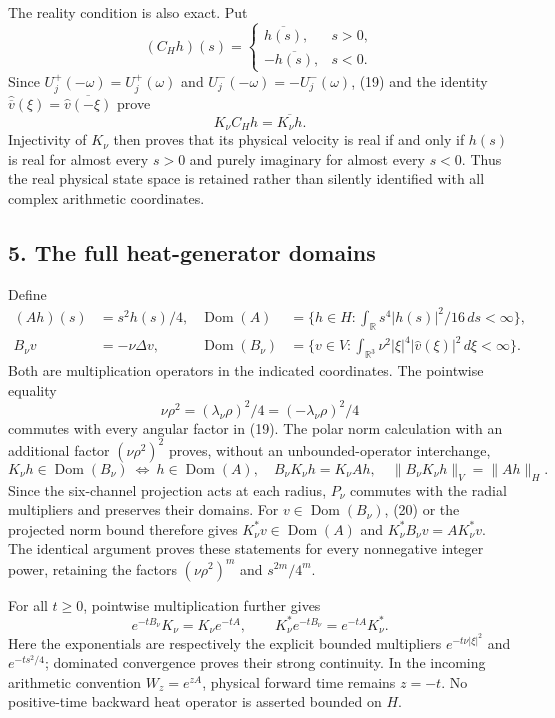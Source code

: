 The reality condition is also exact. Put \[
(C_Hh)(s)=\begin{cases}\overline{h(s)},&s>0,\\-\overline{h(s)},&s<0.\end{cases}
\tag{21}
\] Since \(U_j^+(-\omega)=U_j^+(\omega)\) and \(U_j^-(-\omega)=-U_j^-(\omega)\), (19) and the identity \(\widehat{\overline v}(\xi)=\overline{\widehat v(-\xi)}\) prove \[
K_\nu C_Hh=\overline{K_\nu h}.
\tag{22}
\] Injectivity of \(K_\nu\) then proves that its physical velocity is real if and only if \(h(s)\) is real for almost every \(s>0\) and purely imaginary for almost every \(s<0\). Thus the real physical state space is retained rather than silently identified with all complex arithmetic coordinates.

\subsection*{5. The full heat-generator domains}

Define \[
\begin{aligned}
(Ah)(s)&=s^2h(s)/4,&
\operatorname{Dom}(A)&=\{h\in H:\int_{\mathbb R}s^4|h(s)|^2/16\,ds<\infty\},\\
B_\nu v&=-\nu\Delta v,&
\operatorname{Dom}(B_\nu)&=\{v\in V:\int_{\mathbb R^3}\nu^2|\xi|^4|\widehat v(\xi)|^2\,d\xi<\infty\}.
\end{aligned}
\tag{23}
\] Both are multiplication operators in the indicated coordinates. The pointwise equality \[
\nu\rho^2=(\lambda_\nu\rho)^2/4=(-\lambda_\nu\rho)^2/4
\tag{24}
\] commutes with every angular factor in (19). The polar norm calculation with an additional factor \((\nu\rho^2)^2\) proves, without an unbounded-operator interchange, \[
K_\nu h\in\operatorname{Dom}(B_\nu)\ \Longleftrightarrow\ h\in\operatorname{Dom}(A),
\quad B_\nu K_\nu h=K_\nu Ah,
\quad\|B_\nu K_\nu h\|_V=\|Ah\|_H.
\tag{25}
\] Since the six-channel projection acts at each radius, \(P_\nu\) commutes with the radial multipliers and preserves their domains. For \(v\in\operatorname{Dom}(B_\nu)\), (20) or the projected norm bound therefore gives \(K_\nu^*v\in\operatorname{Dom}(A)\) and \(K_\nu^*B_\nu v=AK_\nu^*v\). The identical argument proves these statements for every nonnegative integer power, retaining the factors \((\nu\rho^2)^m\) and \(s^{2m}/4^m\).

For all \(t\ge0\), pointwise multiplication further gives \[
e^{-tB_\nu}K_\nu=K_\nu e^{-tA},\qquad
K_\nu^*e^{-tB_\nu}=e^{-tA}K_\nu^*.
\tag{26}
\] Here the exponentials are respectively the explicit bounded multipliers \(e^{-t\nu|\xi|^2}\) and \(e^{-ts^2/4}\); dominated convergence proves their strong continuity. In the incoming arithmetic convention \(W_z=e^{zA}\), physical forward time remains \(z=-t\). No positive-time backward heat operator is asserted bounded on \(H\).

